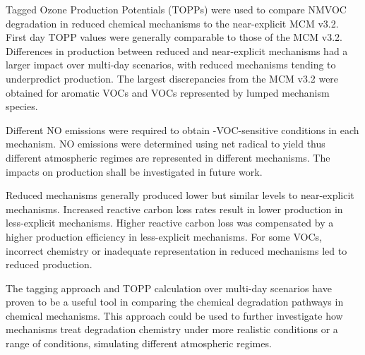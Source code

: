 Tagged Ozone Production Potentials (TOPPs) were used to compare NMVOC degradation in reduced chemical mechanisms to the near-explicit MCM v3.2. 
First day TOPP values were generally comparable to those of the MCM v3.2.
Differences in  production between reduced and near-explicit mechanisms had a larger impact over multi-day scenarios, with reduced mechanisms tending to underpredict  production.  
The largest discrepancies from the MCM v3.2 were obtained for aromatic VOCs and VOCs represented by lumped mechanism species.

Different NO emissions were required to obtain -VOC-sensitive conditions in each mechanism.
NO emissions were determined using net radical to  yield thus different atmospheric regimes are represented in different mechanisms.
The impacts on  production shall be investigated in future work.

Reduced mechanisms generally produced lower but similar  levels to near-explicit mechanisms.
Increased reactive carbon loss rates result in lower  production in less-explicit mechanisms.
Higher reactive carbon loss was compensated by a higher  production efficiency in less-explicit mechanisms. 
For some VOCs, incorrect chemistry or inadequate representation in reduced mechanisms led to reduced  production.

The tagging approach and TOPP calculation over multi-day scenarios have proven to be a useful tool in comparing the chemical degradation pathways in chemical mechanisms. 
This approach could be used to further investigate how mechanisms treat degradation chemistry under more realistic  conditions or a range of  conditions, simulating different atmospheric regimes. 
